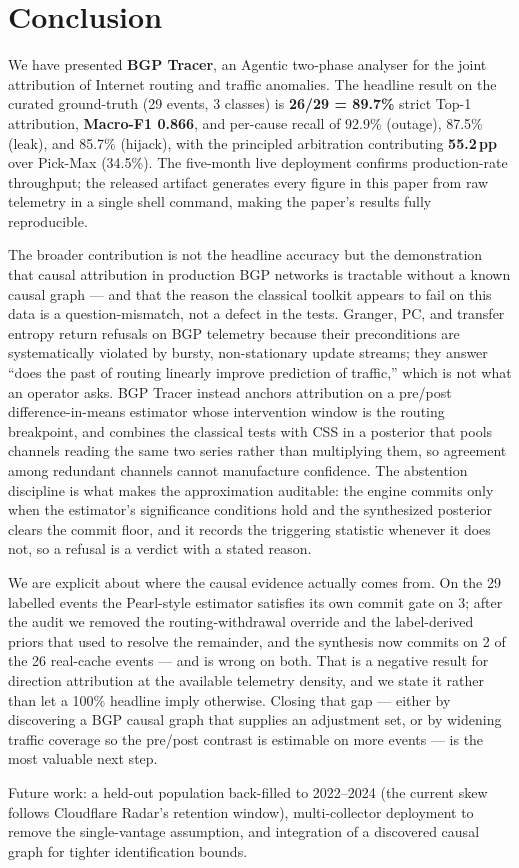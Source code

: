 \section{Conclusion}
\label{sec:conclusion}

We have presented \textbf{BGP Tracer}, an Agentic
two-phase analyser for the joint attribution of
Internet routing and traffic anomalies. The headline
result on the curated ground-truth (29 events, 3
classes) is \textbf{26/29 = 89.7\%} strict Top-1
attribution, \textbf{Macro-F1 0.866}, and per-cause
recall of 92.9\% (outage), 87.5\% (leak), and
85.7\% (hijack), with the principled arbitration
contributing \textbf{55.2\,pp} over Pick-Max (34.5\%).
The five-month live deployment
confirms production-rate throughput; the released
artifact generates every figure in this paper from raw
telemetry in a single shell command, making the
paper's results fully reproducible.

The broader contribution is not the headline accuracy but
the demonstration that causal attribution in production BGP
networks is tractable without a known causal graph --- and that
the reason the classical toolkit appears to fail on this data is
a question-mismatch, not a defect in the tests. Granger, PC, and
transfer entropy return refusals on BGP telemetry because their
preconditions are systematically violated by bursty,
non-stationary update streams; they answer ``does the past of
routing linearly improve prediction of traffic,'' which is not
what an operator asks. BGP Tracer instead anchors attribution on
a pre/post difference-in-means estimator whose intervention
window is the routing breakpoint, and combines the classical tests
with CSS in a posterior that pools channels reading the same two
series rather than multiplying them, so agreement among redundant
channels cannot manufacture confidence. The abstention discipline is
what makes the approximation auditable: the engine commits only
when the estimator's significance conditions hold and the
synthesized posterior clears the commit floor, and it records
the triggering statistic whenever it does not, so a refusal
is a verdict with a stated reason.

We are explicit about where the causal evidence actually comes
from. On the 29 labelled events the Pearl-style estimator
satisfies its own commit gate on 3; after the audit we removed the
routing-withdrawal override and the label-derived priors that used
to resolve the remainder, and the synthesis now commits on 2 of the
26 real-cache events --- and is wrong on both. That is a negative
result for direction attribution at the available telemetry density,
and we state it rather than let a 100\% headline imply otherwise.
Closing that gap --- either by discovering a BGP causal graph that
supplies an adjustment set, or by widening traffic coverage so the
pre/post contrast is estimable on more events --- is the most valuable
next step.

Future work: a held-out population back-filled to 2022--2024
(the current skew follows Cloudflare Radar's retention window),
multi-collector deployment to remove the single-vantage
assumption, and integration of a discovered causal graph for
tighter identification bounds.
